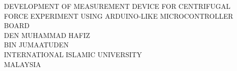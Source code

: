 \begin{titlepage}

    
    \onehalfspacing
    
    \begin{center}%
        {\fontsize{17pt}{20.4}\selectfont DEVELOPMENT OF MEASUREMENT DEVICE FOR CENTRIFUGAL FORCE EXPERIMENT USING ARDUINO-LIKE MICROCONTROLLER BOARD}\\[4em]
        {\fontsize{17pt}{20.4}\selectfont DEN MUHAMMAD HAFIZ\\BIN JUMAATUDEN}\\[3.2cm]
        {\fontsize{17pt}{20.4}\selectfont INTERNATIONAL ISLAMIC UNIVERSITY\\MALAYSIA}\\[3.2cm]
        {\fontsize{17pt}{20.4}}
    \end{center}
    
\end{titlepage}